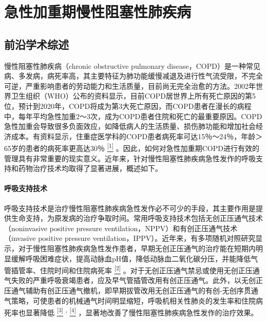 \chapter{急性加重期慢性阻塞性肺疾病}

\section{前沿学术综述}

慢性阻塞性肺疾病（chronic obstructive pulmonary
disease，COPD）是一种常见病、多发病，病死率高，其主要特征为肺功能缓慢减退及进行性气流受限，不完全可逆，严重影响患者的劳动能力和生活质量，目前尚无完全治愈的方法。2002年世界卫生组织（WHO）公布的资料显示，目前COPD居世界上所有死亡原因的第5位，预计到2020年，COPD将成为第3大死亡原因，而COPD患者在漫长的病程中，每年平均急性加重2～3次，成为COPD患者住院和死亡的最重要原因。COPD急性加重会导致很多负面效应，如降低病人的生活质量、损伤肺功能和增加社会经济成本。有资料显示，住重症医学科的COPD患者病死率可达15％～24％，年龄＞65岁的患者的病死率更高达30％
\protect\hyperlink{text00012.htmlux5cux23ch1-11}{\textsuperscript{{[}1{]}}}
。因此，如何对急性加重期COPD进行有效的管理具有非常重要的现实意义。近年来，针对慢性阻塞性肺疾病急性发作的呼吸支持和药物治疗技术均取得了显著进展，概述如下。

\subsubsection{呼吸支持技术}

呼吸支持技术是治疗慢性阻塞性肺疾病急性发作必不可少的手段，其主要作用是提供生命支持，为原发病的治疗争取时间。常用呼吸支持技术包括无创正压通气技术（noninvasive
positive pressure ventilation，NPPV）和有创正压通气技术（invasive
positive pressure
ventilation，IPPV）。近年来，有多项随机对照研究显示，对于慢性阻塞性肺疾病急性发作患者，早期无创正压通气的治疗能在短期内明显缓解呼吸困难症状，提高动脉血pH值，降低动脉血二氧化碳分压，并能降低气管插管率、住院时间和住院病死率
\protect\hyperlink{text00012.htmlux5cux23ch2-11}{\textsuperscript{{[}2{]}}}
。对于无创正压通气禁忌或使用无创正压通气失败的严重呼吸衰竭患者，应及早气管插管改用有创正压通气。此外，以无创正压通气辅助有创正压通气撤机，即早期拔管改用无创正压通气的有创-无创序贯通气策略，可使患者的机械通气时间明显缩短，呼吸机相关性肺炎的发生率和住院病死率也显著降低
\protect\hyperlink{text00012.htmlux5cux23ch3-11}{\textsuperscript{{[}3{]}}}
\textsuperscript{,}
\protect\hyperlink{text00012.htmlux5cux23ch4-11}{\textsuperscript{{[}4{]}}}
，显著地改善了慢性阻塞性肺疾病急性发作的治疗效果。

